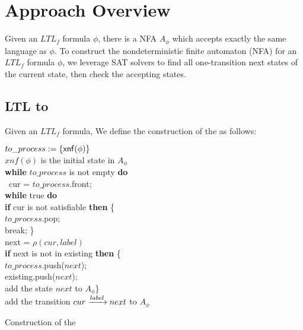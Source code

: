 \section{Approach Overview}
Given an $LTL_f$ formula $\phi$, there is a NFA $A_{\phi}$ which accepts exactly the same language as $\phi$. To construct the nondeterministic finite automaton (NFA) for an $ LTL_f$ formula $\phi$, we leverage SAT solvers to find all one-transition next states of the current state, then check the accepting states. 

\subsection{LTL to \NFA}
Given an  $ LTL_f$ formula, We define the construction of the \NFA  as follows: \\
  \begin{algorithm}[H]
    \SetAlgoNoLine
    \BlankLine
 $to\_process:= \{{\sf xnf}(\phi)\}$\\
 $xnf(\phi)$ is the initial state in $A_{\phi}$\\
\textbf{while} $to\_process$ is not empty \textbf{do} \\
\ cur =  $to\_process$.front;  \\
\quad  \textbf{while} true \textbf{do} \\
\qquad   \textbf{if} cur is not satisfiable  \textbf{then} \{ \\
\qquad \quad $to\_process$.pop; \\
\qquad \quad break;     \}\\
 \qquad  next = $\rho(cur, label)$ \\
\qquad\textbf{if} next is not in existing \textbf{then} \{ \\
\qquad \quad $to\_process$.push($next$); \\
\qquad \quad existing.push($next$); \\
\qquad  \quad add the state $next$ to $A_{\phi}$\}\\
\qquad  add the transition $cur\xrightarrow[]{label}next$ to $A_{\phi}$
 \caption{Construction of the \NFA}
\end{algorithm}

